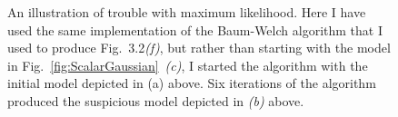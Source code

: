\begin{figure}[htbp]
  \caption[An illustration of trouble with maximum likelihood.]%
  {An illustration of trouble with maximum likelihood.  Here I have
    used the same implementation of the Baum-Welch algorithm that I
    used to produce Fig.~3.2\emph{(f)}, but rather than
    starting with the model in Fig.~\ref{fig:ScalarGaussian}~\emph{(c)}, I
    started the algorithm with the initial model depicted in (a)
    above.  Six iterations of the algorithm produced the suspicious
    model depicted in \emph{(b)} above.}
  \label{fig:MLEfail}%
\end{figure} 

